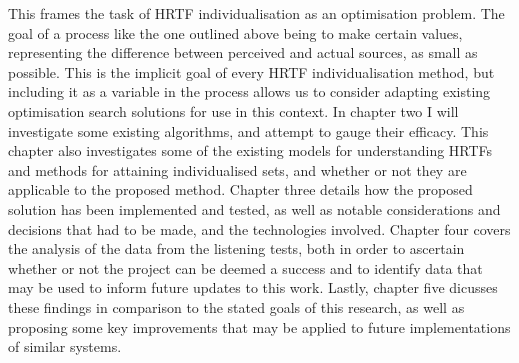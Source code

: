 This frames the task of HRTF individualisation as an optimisation problem. The goal of a process like the one outlined above being to make certain values, representing the difference between perceived and actual sources, as small as possible. This is the implicit goal of every HRTF individualisation method, but including it as a variable in the process allows us to consider adapting existing optimisation search solutions for use in this context. In chapter two I will investigate some existing algorithms, and attempt to gauge their efficacy. This chapter also investigates some of the existing models for understanding HRTFs and methods for attaining individualised sets, and whether or not they are applicable to the proposed method. Chapter three details how the proposed solution has been implemented and tested, as well as notable considerations and decisions that had to be made, and the technologies involved. Chapter four covers the analysis of the data from the listening tests, both in order to ascertain whether or not the project can be deemed a success and to identify data that may be used to inform future updates to this work. Lastly, chapter five dicusses these findings in comparison to the stated goals of this research, as well as proposing some key improvements that may be applied to future implementations of similar systems. 




